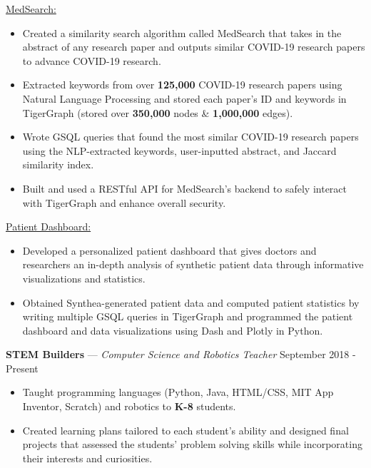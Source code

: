\documentclass[11pt]{res}
\begin{document}
\begin{footnotesize}
\begin{resume}
\setlength{\parindent}{4ex}\underline{MedSearch:}
\vspace{-4.75mm}
\begin{itemize} \itemsep -2pt 
\item Created a similarity search algorithm called MedSearch that takes in the abstract of any research paper and outputs similar COVID-19 research papers to advance COVID-19 research.
\vspace{1mm}
\item Extracted keywords from over \textbf{125,000} COVID-19 research papers using Natural Language Processing and stored each paper's ID and keywords in TigerGraph (stored over \textbf{350,000} nodes \& \textbf{1,000,000} edges).
\vspace{1mm}
\item Wrote GSQL queries that found the most similar COVID-19 research papers using the NLP-extracted keywords, user-inputted abstract, and Jaccard similarity index.
\vspace{1mm}
\item Built and used a RESTful API for MedSearch's backend to safely interact with TigerGraph and enhance overall security.
\end{itemize}
\vspace{-4.5mm}

\setlength{\parindent}{4ex}\underline{Patient Dashboard:}
\vspace{-4.75mm}
\begin{itemize} \itemsep -2pt 
\item Developed a personalized patient dashboard that gives doctors and researchers an in-depth analysis of synthetic patient data through informative visualizations and statistics. 
\vspace{1mm}
\item Obtained Synthea-generated patient data and computed patient statistics by writing multiple GSQL queries in TigerGraph and programmed the patient dashboard and data visualizations using Dash and Plotly in Python.
\end{itemize}
\vspace{-2.5mm}
\textbf{STEM Builders} — {\sl Computer Science and Robotics Teacher} \hfill September 2018 - Present\vspace{-4.75mm}
\begin{itemize} \itemsep -2pt 
\item Taught programming languages (Python, Java, HTML/CSS, MIT App Inventor, Scratch) and robotics to \textbf{K-8} students. 
\vspace{1mm}
\item Created learning plans tailored to each student's ability and designed final projects that assessed the students' problem solving skills while incorporating their interests and curiosities. 
\end{itemize}
\begin{small}

\end{small}
\end{resume}
\end{footnotesize}
\end{document}
